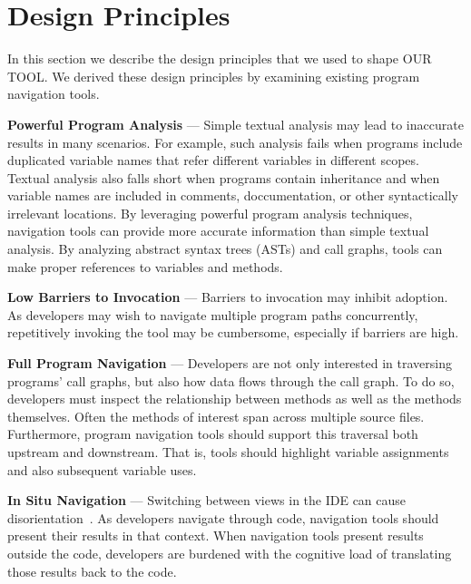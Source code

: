 \documentclass[conference]{IEEEtran}
\newcommand{\toolName}{OUR TOOL}
\begin{document}
\section{Design Principles}
\label{DesignPrinciples}
In this section we describe the design principles that we used to shape \toolName. We derived these design principles by examining existing program navigation tools.
 
\vspace{1em} 
\noindent\textbf{Powerful Program Analysis} ---
Simple textual analysis may lead to inaccurate results in many scenarios. For example, such analysis fails when programs include duplicated variable names that refer different variables in different scopes. Textual analysis also falls short when programs contain inheritance and when variable names are included in comments, doccumentation, or other syntactically irrelevant locations.
By leveraging powerful program analysis techniques, navigation tools can provide more accurate information than simple textual analysis.
By analyzing abstract syntax trees (ASTs) and call graphs, tools can make proper references to variables and methods. 

\vspace{1em} 
\noindent\textbf{Low Barriers to Invocation} ---
Barriers to invocation may inhibit adoption. 
As developers may wish to navigate multiple program paths concurrently, repetitively invoking the tool may be cumbersome, especially if barriers are high. 


\vspace{1em} 
\noindent\textbf{Full Program Navigation}  ---
Developers are not only interested in traversing programs' call graphs, but also how data flows through the call graph.
To do so, developers must inspect the relationship between methods as well as the methods themselves.
Often the methods of interest span across multiple source files.
Furthermore, program navigation tools should support this traversal both upstream and downstream. 
That is, tools should highlight variable assignments and also subsequent variable uses. 

\vspace{1em} 
\noindent\textbf{In Situ Navigation}  ---
Switching between views in the IDE can cause disorientation~\cite{deAlwis2006disorient}. As developers navigate through code, navigation tools should present their results in that context. 
When navigation tools present results outside the code, developers are burdened with the cognitive load of translating those results back to the code.
\end{document}
